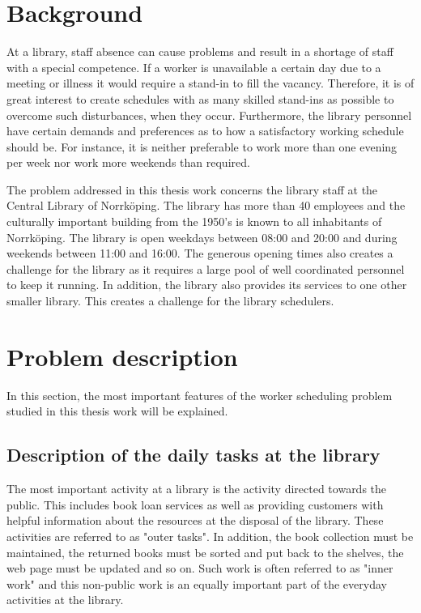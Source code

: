 
\section{Background}


At a library, staff absence can cause problems and result in a shortage of staff with a special competence. If a worker is unavailable a certain day due to a meeting or illness it would require a stand-in to fill the vacancy. Therefore, it is of great interest to create schedules with as many skilled stand-ins as possible to overcome such disturbances, when they occur. Furthermore, the library personnel have certain demands and preferences as to how a satisfactory working schedule should be. For instance, it is neither preferable to work more than one evening per week nor work more weekends than required. 

The problem addressed in this thesis work concerns the library staff at the Central Library of Norrköping. The library has more than 40 employees and the culturally important building from the 1950's is known to all inhabitants of Norrköping. The library is open weekdays between 08:00 and 20:00 and during weekends between 11:00 and 16:00. The generous opening times also creates a challenge for the library as it requires a large pool of well coordinated personnel to keep it running. In addition, the library also provides its services to one other smaller library. This creates a challenge for the library schedulers.

\section{Problem description}

In this section, the most important features of the worker scheduling problem studied in this thesis work will be explained.  

\subsection{Description of the daily tasks at the library} \label{section:library_tasks}
The most important activity at a library is the activity directed towards the public. This includes book loan services as well as providing customers with helpful information about the resources at the disposal of the library. These activities are referred to as "outer tasks". In addition, the book collection must be maintained, the returned books must be sorted and put back to the shelves, the web page must be updated and so on. Such work is often referred to as "inner work" and this non-public work is an equally important part of the everyday activities at the library. 

